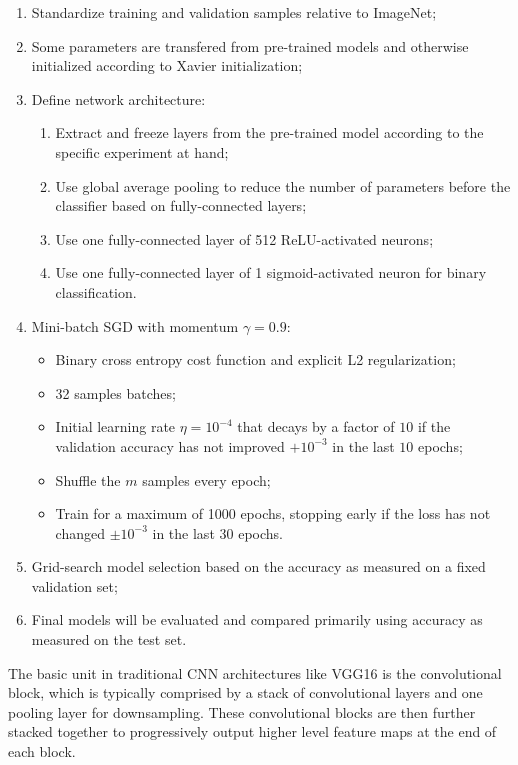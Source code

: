 \begin{enumerate}
    \item Standardize training and validation samples relative to ImageNet;
    \item Some parameters are transfered from pre-trained models and otherwise initialized according to Xavier initialization;
    \item Define network architecture:
        \begin{enumerate}
            \item Extract and freeze layers from the pre-trained model according to the specific experiment at hand;
            \item Use global average pooling to reduce the number of parameters before the classifier based on fully-connected layers;
            \item Use one fully-connected layer of 512 ReLU-activated neurons;
            \item Use one fully-connected layer of 1 sigmoid-activated neuron for binary classification.
        \end{enumerate}
    \item Mini-batch \ac{SGD} with momentum $\gamma = 0.9$:
        \begin{itemize}
            \item Binary cross entropy cost function and explicit L2 regularization;
            \item 32 samples batches;
            \item Initial learning rate $\eta = 10^{-4}$ that decays by a factor of $10$ if the validation accuracy has not improved $+10^{-3}$ in the last $10$ epochs;
            \item Shuffle the $m$ samples every epoch;
            \item Train for a maximum of 1000 epochs, stopping early if the loss has not changed $\pm 10^{-3}$ in the last $30$ epochs.
        \end{itemize}
    \item Grid-search model selection based on the accuracy as measured on a fixed validation set;
    \item Final models will be evaluated and compared primarily using accuracy as measured on the test set.
\end{enumerate}

The basic unit in traditional \ac{CNN} architectures like VGG16 is the convolutional block, which is typically comprised by a stack of convolutional layers and one pooling layer for downsampling. These convolutional blocks are then further stacked together to progressively output higher level feature maps at the end of each block.

